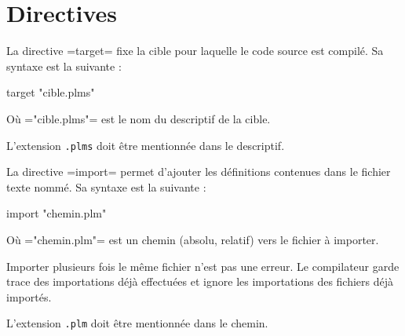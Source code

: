 




\chapter{Directives}




La directive \plm=target= fixe la cible pour laquelle le code source est compilé. Sa syntaxe est la suivante :
\begin{PLM}
target "cible.plms"
\end{PLM} 
Où \plm="cible.plms"= est le nom du descriptif de la cible.

L'extension \texttt{.plms} doit être mentionnée dans le descriptif.





La directive \plm=import= permet d'ajouter les définitions contenues dans le fichier texte nommé. Sa syntaxe est la suivante :
\begin{PLM}
import "chemin.plm"
\end{PLM} 
Où \plm="chemin.plm"= est un chemin (absolu, relatif) vers le fichier à importer.

Importer plusieurs fois le même fichier n'est pas une erreur. Le compilateur garde trace des importations déjà effectuées et ignore les importations des fichiers déjà importés.

L'extension \texttt{.plm} doit être mentionnée dans le chemin.
